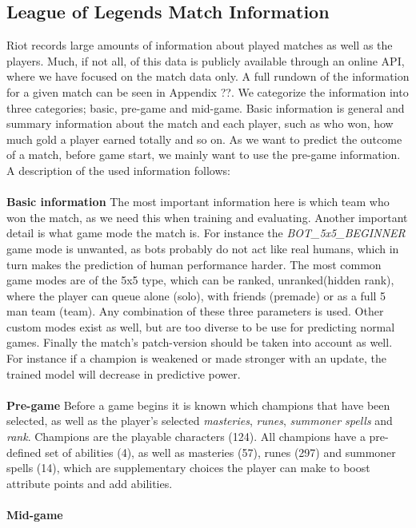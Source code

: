 \subsection{League of Legends Match Information}
Riot records large amounts of information about played matches as well as the players. Much, if not all, of this data is publicly available through an online API, where we have focused on the match data only. A full rundown of the information for a given match can be seen in Appendix ??. We categorize the information into three categories; basic, pre-game and mid-game. Basic information is general and summary information about the match and each player, such as who won, how much gold a player earned totally and so on. As we want to predict the outcome of a match, before game start, we mainly want to use the pre-game information. A description of the used information follows:\\\\
\textbf{Basic information}
The most important information here is which team who won the match, as we need this when training and evaluating. Another important detail is what game mode the match is. For instance the \textit{BOT\_5x5\_BEGINNER} game mode is unwanted, as bots probably do not act like real humans, which in turn makes the prediction of human performance harder. The most common game modes are of the 5x5 type, which can be ranked, unranked(hidden rank), where the player can queue alone (solo), with friends (premade) or as a full 5 man team (team). Any combination of these three parameters is used. Other custom modes exist as well, but are too diverse to be use for predicting normal games. Finally the match’s patch-version should be taken into account as well. For instance if a champion is weakened or made stronger with an update, the trained model will decrease in predictive power.\\\\
\textbf{Pre-game}
Before a game begins it is known which champions that have been selected, as well as the player’s selected \textit{masteries}, \textit{runes}, \textit{summoner spells} and \textit{rank}. Champions are the playable characters (124). All champions have a pre-defined set of abilities (4), as well as masteries (57), runes (297) and summoner spells (14), which are supplementary choices the player can make to boost attribute points and add abilities.\\\\
\textbf{Mid-game}
